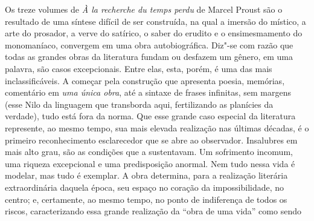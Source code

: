 Os treze volumes de \emph{À la recherche du temps perdu} de Marcel
Proust são o resultado de uma síntese difícil de ser construída, na qual
a imersão do místico, a arte do prosador, a verve do satírico, o saber
do erudito e o ensimesmamento do monomaníaco, convergem em uma obra
autobiográfica. Diz"-se com razão que todas as grandes obras da
literatura fundam ou desfazem um gênero, em uma palavra, são casos
excepcionais. Entre elas, esta, porém, é uma das mais inclassificáveis.
A começar pela construção que apresenta poesia, memórias, comentário em
\emph{uma única obra}, até a sintaxe de frases infinitas, sem margens
(esse Nilo da linguagem que transborda aqui, fertilizando as planícies
da verdade), tudo está fora da norma. Que esse grande caso especial da
literatura represente, ao mesmo tempo, sua mais elevada realização nas
últimas décadas, é o primeiro reconhecimento esclarecedor que se abre ao
observador. Insalubres em mais alto grau, são as condições que a
sustentavam. Um sofrimento incomum, uma riqueza excepcional e uma
predisposição anormal. Nem tudo nessa vida é modelar, mas tudo é
exemplar. A obra determina, para a realização literária extraordinária
daquela época, seu espaço no coração da impossibilidade, no centro; e,
certamente, ao mesmo tempo, no ponto de indiferença de todos os riscos,
caracterizando essa grande realização da ``obra de uma vida'' como sendo

